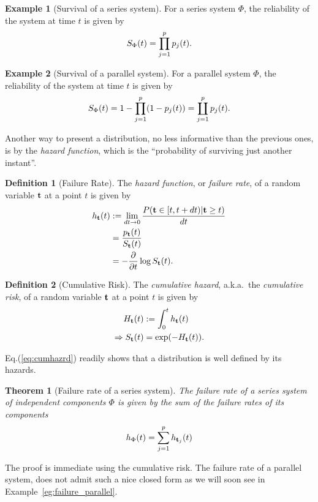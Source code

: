 \documentclass[12pt,a4paper]{report}
\theoremstyle{plain}
\newtheorem{theorem}{Theorem}[section]
\theoremstyle{definition}
\newtheorem{definition}{Definition}
\newtheorem{example}{Example}
\newcommand{\aka}{{a.k.a.\ }}
\newcommand{\struct}{\Phi}
\begin{document}
\begin{example}[Survival of a series system]
For a series system $\struct$, the reliability of the system at time $t$ is given by $$S_{\Phi} (t)=\prod_{j=1}^{p} p_j(t).$$
\end{example}


\begin{example}[Survival of a parallel system]
For a parallel system $\struct$, the reliability of the system at time $t$ is given by $$S_{\Phi} (t)=1- \prod_{j=1}^{p} (1-p_j(t))= \coprod_{j=1}^p p_j(t).$$
\end{example}





Another way to present a distribution, no less informative than the previous ones, is by the \emph{hazard function}, which is the ``probability of surviving just another instant''.
\begin{definition}[Failure Rate]
The \emph{hazard function}, or \emph{failure rate}, of a random variable $\mathbf{t}$ at a point $t$ is given by 
\begin{align}
	h_{\mathbf{t}} (t) &:= \lim_{dt\to 0}\frac{P( \mathbf{t} \in [t,t+dt)|\mathbf{t} \geq t )}{dt} \label{eq:hazard}\\
	&= \frac{p_{\mathbf{t}} (t)}{S_{\mathbf{t}} (t)} \\
	&= - \frac{\partial}{\partial t}\log S_{\mathbf{t}} (t) . \label{eq:survival_to_hazard}
\end{align}
\end{definition}





\begin{definition}[Cumulative Risk]
The \emph{cumulative hazard}, \aka the \emph{cumulative risk}, of a random variable $\mathbf{t}$ at a point $t$ is given by 
\begin{align}
	H_{\mathbf{t}} (t) &:= \int_{0}^{t}h_{\mathbf{t}} (t) \\
	\Rightarrow S_{\mathbf{t}} (t) &= \exp(-H_{\mathbf{t}} (t)). \label{eq:cumhazrd}
\end{align}
\end{definition}
Eq.(\ref{eq:cumhazrd}) readily shows that a distribution is well defined by its hazards.



\begin{theorem}[Failure rate of a series system]
\label{thm:ifr_closure}
The failure rate of a series system of independent components $\Phi$ is given by the sum of the failure rates of its components
\begin{align}
	h_{\Phi} (t)= \sum_{j=1}^{p} h_{\mathbf{t}_j} (t)
\end{align}
\end{theorem}
The proof is immediate using the cumulative risk.
The failure rate of a parallel system, does not admit such a nice closed form as we will soon see in Example~\ref{eg:failure_parallel}.
\end{document}
